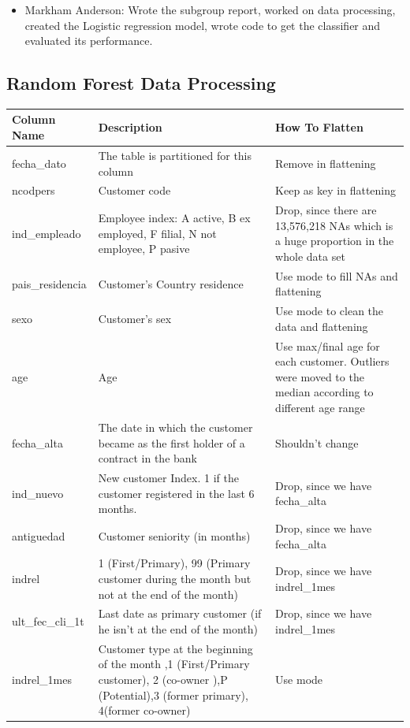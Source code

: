 \documentclass{article}
\begin{document}
\begin{spacing}{1}
\begin{large}
\begin{itemize}
	\item Markham Anderson: Wrote the subgroup report, worked on data processing, created the Logistic regression model, wrote code to get the classifier and evaluated its performance.
\end{itemize}

\newpage

\begin{appendices}
	
	\section{Random Forest Data Processing}
	\label{appendix:rn_data}
	\begin{longtable}{p{3cm}|p{5cm}|p{5cm}}
		Column Name & Description & How To Flatten  \\
		\hline
		fecha\_dato & The table is partitioned for this column & Remove in flattening \\
		ncodpers & Customer code & Keep as key in flattening \\
		ind\_empleado & Employee index: A active, B ex employed, F filial, N not employee, P pasive & Drop, since there are 13,576,218 NAs which is a huge proportion in the whole data set \\
		pais\_residencia & Customer's Country residence & Use mode to fill NAs and flattening\\
		sexo & Customer's sex & Use mode to clean the data and flattening\\
		age & Age & Use max/final age for each customer. Outliers were moved to the median according to different age range \\
		fecha\_alta & The date in which the customer became as the first holder of a contract in the bank & Shouldn't change \\
		ind\_nuevo & New customer Index. 1 if the customer registered in the last 6 months. & Drop, since we have fecha\_alta \\
		antiguedad & Customer seniority (in months) & Drop, since we have fecha\_alta \\
		indrel & 1 (First/Primary), 99 (Primary customer during the month but not at the end of the month) & Drop, since we have indrel\_1mes \\
		ult\_fec\_cli\_1t & Last date as primary customer (if he isn't at the end of the month) & Drop, since we have indrel\_1mes \\
		indrel\_1mes & Customer type at the beginning of the month ,1 (First/Primary customer), 2 (co-owner ),P (Potential),3 (former primary), 4(former co-owner) & Use mode \\

\end{longtable}
\end{appendices}
\end{large}
\end{spacing}
\end{document}
